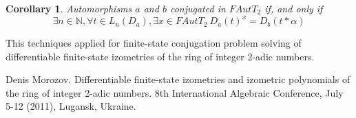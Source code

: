 \documentclass[12pt]{article}
\newtheorem{corollary}{Corollary}
\begin{document}
\begin{corollary}\label{marked_trees_conj_level}
Automorphisms $a$ and $b$ conjugated in $FAutT_2$ if, and only if
$$\exists n\in\mathbb{N}, \forall t\in L_n(D_a), \exists x\in FAutT_2\ D_a(t)^x= D_b(t*\alpha) $$
\end{corollary}


This techniques applied for finite-state conjugation problem solving of differentiable  finite-state izometries of the ring of integer 2-adic numbers.

\vspace{-5mm}\small
\begin{thebibliography}{10}
 Denis Morozov. {Differentiable finite-state izometries and izometric
polynomials of the ring of integer 2-adic numbers}. 8th International Algebraic Conference, 
July 5-12 (2011), Lugansk, Ukraine.
\end{thebibliography}
\end{document}
